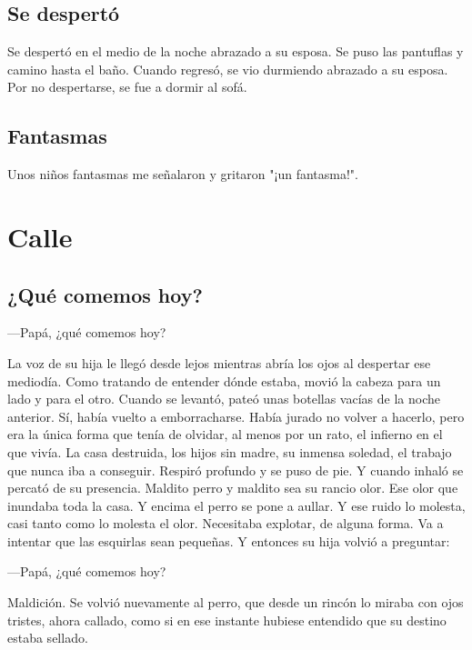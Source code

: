 \documentclass[11pt,twoside,openright,a6paper]{book}
\begin{document}
\chapter*{Se despertó}

Se despertó en el medio de la noche abrazado a su esposa. Se puso las pantuflas y camino hasta el baño. Cuando regresó, se vio durmiendo abrazado a su esposa. Por no despertarse, se fue a dormir al sofá.

\chapter*{Fantasmas}

Unos niños fantasmas me señalaron y gritaron "¡un fantasma!".

\part*{Calle}

\chapter*{¿Qué comemos hoy?}

---Papá, ¿qué comemos hoy?

La voz de su hija le llegó desde lejos mientras abría los ojos al despertar ese mediodía. Como tratando de entender dónde estaba, movió la cabeza para un lado y para el otro. Cuando se levantó, pateó unas botellas vacías de la noche anterior. Sí, había vuelto a emborracharse. Había jurado no volver a hacerlo, pero era la única forma que tenía de olvidar, al menos por un rato, el infierno en el que vivía. La casa destruida, los hijos sin madre, su inmensa soledad, el trabajo que nunca iba a conseguir. Respiró profundo y se puso de pie. Y cuando inhaló se percató de su presencia. Maldito perro y maldito sea su rancio olor. Ese olor que inundaba toda la casa. Y encima el perro se pone a aullar. Y ese ruido lo molesta, casi tanto como lo molesta el olor. Necesitaba explotar, de alguna forma. Va a intentar que las esquirlas sean pequeñas.
Y entonces su hija volvió a preguntar:

---Papá, ¿qué comemos hoy?

Maldición. Se volvió nuevamente al perro, que desde un rincón lo miraba con ojos tristes, ahora callado, como si en ese instante hubiese entendido que su destino estaba sellado.
\end{document}
